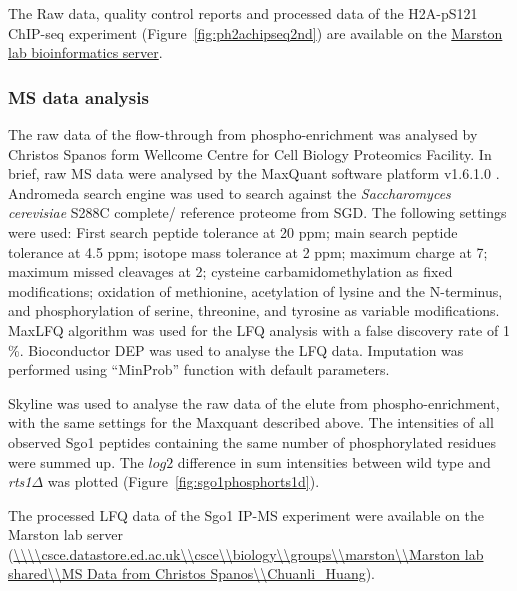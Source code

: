 The Raw data, quality control reports and processed data of the H2A-pS121 ChIP-seq experiment (Figure~\ref{fig:ph2achipseq2nd}) are available on the \href{https://bifx-core3.bio.ed.ac.uk/Results/Adele/Projects/Chuanli2022/H2A-pS121_ChIPSeq/}{Marston lab bioinformatics server}.

\subsubsection{MS data analysis}

The raw data of the flow-through from phospho-enrichment was analysed by Christos Spanos form Wellcome Centre for Cell Biology Proteomics Facility. In brief, raw MS data were analysed by the MaxQuant software platform v1.6.1.0 \citep{Cox2008MaxQuantQuantification}. Andromeda search engine \citep{Cox2011Andromeda:Environment} was used to search against the \textit{Saccharomyces cerevisiae} S288C complete/ reference proteome from SGD. The following settings were used: First search peptide tolerance at 20 ppm; main search peptide tolerance at 4.5 ppm; isotope mass tolerance at 2 ppm; maximum charge at 7; maximum missed cleavages at 2; cysteine carbamidomethylation as fixed modifications; oxidation of methionine, acetylation of lysine and the N-terminus, and phosphorylation of serine, threonine, and tyrosine as variable modifications. MaxLFQ algorithm \citep{Cox2014AccurateMaxLFQ} was used for the LFQ analysis with a false discovery rate of 1 \%. Bioconductor DEP \citep{Zhang2018Proteome-wideUbIA-MS} was used to analyse the LFQ data. Imputation was performed using “MinProb” function with default parameters. 

Skyline \citep{MacLean2010Skyline:Experiments} was used to analyse the raw data of the elute from phospho-enrichment, with the same settings for the Maxquant described above. The intensities of all observed Sgo1 peptides containing the same number of phosphorylated residues were summed up. The $log2$ difference in sum intensities between wild type and \textit{rts1}$\Delta$ was plotted (Figure~\ref{fig:sgo1phosphorts1d}).

The processed LFQ data of the Sgo1 IP-MS experiment were available on the Marston lab server (\url{\\\\csce.datastore.ed.ac.uk\\csce\\biology\\groups\\marston\\Marston lab shared\\MS Data from Christos Spanos\\Chuanli_Huang}). 

